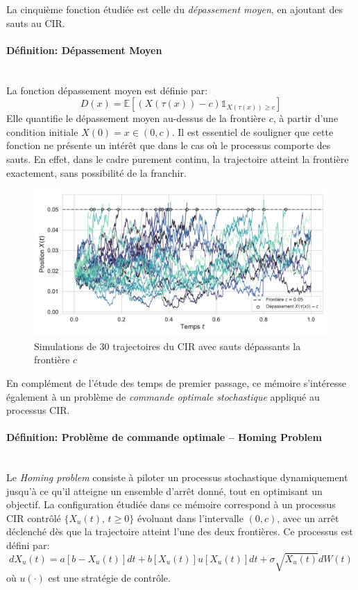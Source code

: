 La cinquième fonction étudiée est celle du \textit{dépassement moyen}, en ajoutant des sauts au \acs{CIR}.
\paragraph{Définition: Dépassement Moyen}\mbox{}\\
La fonction dépassement moyen est définie par: 
\begin{equation}\label{overshoot}
    D(x)=\mathds{E}\left[(X(\tau(x))-c)\mathds1_{X(\tau(x))\geq c}\right]
\end{equation}
Elle quantifie le dépassement moyen au-dessus de la frontière \( c \), à partir d'une condition initiale \( X(0) = x \in (0, c) \). Il est essentiel de souligner que cette fonction ne présente un intérêt que dans le cas où le processus comporte des sauts. En effet, dans le cadre purement continu, la trajectoire atteint la frontière exactement, sans possibilité de la franchir.
\begin{figure}[htb]
    \centering
    \includegraphics[width=\linewidth]{img/intro/overshoot.pdf}
    \caption{Simulations de 30 trajectoires du \acs{CIR} avec sauts dépassants la frontière $c$}\label{fig:OvershootViz}
\end{figure}
\FloatBarrier
En complément de l'étude des temps de premier passage, ce mémoire s'intéresse également à un problème de \textit{commande optimale stochastique} appliqué au processus \acs{CIR}.\\
\paragraph{Définition: Problème de commande optimale -- Homing Problem}\label{definition_optimal_control}\mbox{}\\
Le \textit{Homing problem} consiste à piloter un processus stochastique dynamiquement jusqu'à ce qu'il atteigne un ensemble d'arrêt donné, tout en optimisant un objectif. La configuration étudiée dans ce mémoire correspond à un processus \acs{CIR} contrôlé \( \{X_u(t),\, t \geq 0\} \) évoluant dans l'intervalle \( (0, c) \), avec un arrêt déclenché dès que la trajectoire atteint l'une des deux frontières. Ce processus est défini par:
\begin{equation}\label{controlled_process}
    dX_u(t) = a[b - X_u(t)]dt + b[X_u(t)]u[X_u(t)]dt + \sigma \sqrt{X_u(t)} dW(t)
\end{equation}
où \( u(\cdot) \) est une stratégie de contrôle.

